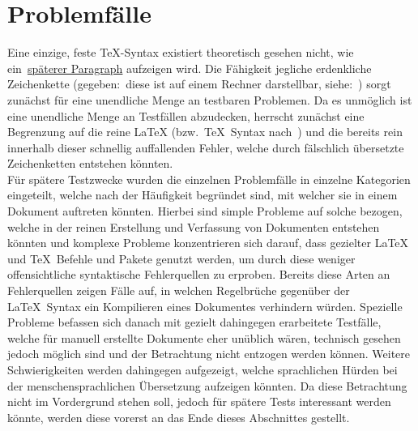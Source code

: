 
\section{Problemfälle}
Eine einzige, feste \TeX{}-Syntax existiert theoretisch gesehen nicht, wie ein~\hyperref[par:catcode]{späterer Paragraph} aufzeigen wird.%
Die Fähigkeit jegliche erdenkliche Zeichenkette (gegeben:\ diese ist auf einem Rechner darstellbar, siehe:~\cite{unicode}) sorgt zunächst für eine unendliche Menge an testbaren Problemen. Da es unmöglich ist eine unendliche Menge an Testfällen abzudecken, herrscht zunächst eine Begrenzung auf die reine \LaTeX{} (bzw.\ \TeX{}~Syntax nach~\cite{texbook}) und die bereits rein innerhalb dieser schnellig auffallenden Fehler, welche durch fälschlich übersetzte Zeichenketten entstehen könnten.\\\noindent
Für spätere Testzwecke wurden die einzelnen Problemfälle in einzelne Kategorien eingeteilt, welche nach der Häufigkeit begründet sind, mit welcher sie in einem Dokument auftreten könnten. Hierbei sind simple Probleme auf solche bezogen, welche in der reinen Erstellung und Verfassung von Dokumenten entstehen könnten und komplexe Probleme konzentrieren sich darauf, dass gezielter \LaTeX{} und \TeX{}~Befehle und Pakete genutzt werden, um durch diese weniger offensichtliche syntaktische Fehlerquellen zu erproben. Bereits diese Arten an Fehlerquellen zeigen Fälle auf, in welchen Regelbrüche gegenüber der \LaTeX{}~Syntax ein Kompilieren eines Dokumentes verhindern würden. Spezielle Probleme befassen sich danach mit gezielt dahingegen erarbeitete Testfälle, welche für manuell erstellte Dokumente eher unüblich wären, technisch gesehen jedoch möglich sind und der Betrachtung nicht entzogen werden können. Weitere Schwierigkeiten werden dahingegen aufgezeigt, welche sprachlichen Hürden bei der menschensprachlichen Übersetzung aufzeigen könnten. Da diese Betrachtung nicht im Vordergrund stehen soll, jedoch für spätere Tests interessant werden könnte, werden diese vorerst an das Ende dieses Abschnittes gestellt.

